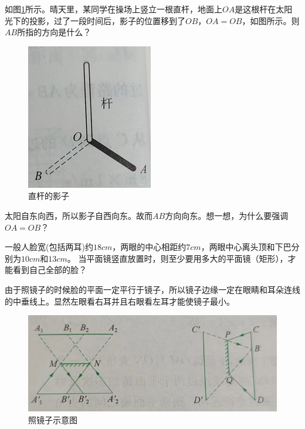 \documentclass[windows,csize4, answers]{BHCexam}
\begin{document}
\begin{groups}
\begin{questions}[]
    \end{questions}

    \clearpage
    \begin{questions}[]

        \question[5] 如图\ref{fig:fig_3_7}所示。晴天里，某同学在操场上竖立一根直杆，地面上$OA$是这根杆在太阳光下的投影，过了一段时间后，影子的位置移到了$OB$，$OA=OB$，如图所示。则$AB$所指的方向是什么？
        \begin{figure}[htb]
            \centering
            \includegraphics [scale=0.75,trim=0 0 0 0]{./image/fig_3_7.PNG}
            \caption{直杆的影子}
            \label{fig:fig_3_7}
        \end{figure}
        \begin{solution}{0.5cm}
            \methodonly 太阳自东向西，所以影子自西向东。故而$AB$方向向东。想一想，为什么要强调$OA=OB$？
        \end{solution}
        \vspace{3cm}

        \question[5] 一般人脸宽(包括两耳)约$18cm$，两眼的中心相距约$7cm$，两眼中心离头顶和下巴分别为$10cm$和$13cm$。
        当平面镜竖直放置时，则至少要用多大的平面镜（矩形），才能看到自己全部的脸？
        \begin{solution}{0.5cm}
            \methodonly 由于照镜子的时候脸的平面一定平行于镜子，所以镜子边缘一定在眼睛和耳朵连线的中垂线上。显然左眼看右耳并且右眼看左耳才能使镜子最小。
            \begin{figure}[htb]
                \centering
                \includegraphics [scale=0.5,trim=0 0 0 0]{./image/fig_3_15.PNG}
                \caption{照镜子示意图}
                \label{fig:fig_3_15}
            \end{figure}
        \end{solution}





\end{questions}
\end{groups}
\end{document}
